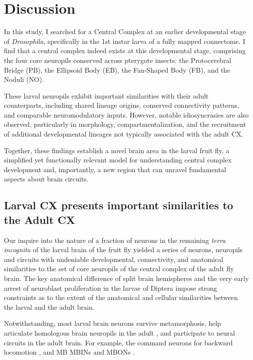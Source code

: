 \chapter{Discussion}

In this study, I searched for a Central Complex at an earlier developmental stage of \textit{Drosophila}, specifically in the 1st instar larva of a fully mapped connectome. I find that a central complex indeed exists at this developmental stage, comprising the four core neuropils conserved across pterygote insects: the Protocerebral Bridge (PB), the Ellipsoid Body (EB), the Fan-Shaped Body (FB), and the Noduli (NO). 

These larval neuropils exhibit important similarities with their adult counterparts, including shared lineage origins, conserved connectivity patterns, and comparable neuromodulatory inputs. However, notable idiosyncrasies are also observed, particularly in morphology, compartmentalization, and the recruitment of additional developmental lineages not typically associated with the adult CX. 

Together, these findings establish a novel brain area in the larval fruit fly, a simplified yet functionally relevant model for understanding central complex development and, importantly, a new region that can unravel fundamental aspects about brain circuits.

\section{Larval CX presents important similarities to the Adult CX}
Our inquire into the nature of a fraction of neurons in the remaining \textit{terra incognita} of the larval brain of the fruit fly yielded a series of neurons, neuropils and circuits with undeniable developmental, connectivity, and anatomical similarities to the set of core neuropils of the central complex of the adult fly brain.
The key anatomical difference of split brain hemispheres and the very early arrest of neuroblast proliferation in the larvae of Diptera impose strong constraints as to the extent of the anatomical and cellular similarities between the larval and the adult brain.

Notwithstanding, most larval brain neurons survive metamorphosis, help articulate homologous brain neuropils in the adult \citep{prieto2012embryonic}, and participate to neural circuits in the adult brain. For example, the command neurons for backward locomotion \citep{carreira2018mdn}, and MB MBINs and MBONs \citep{truman2023metamorphosis}.

